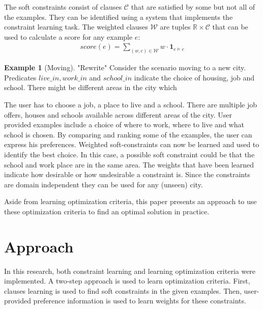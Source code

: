 \documentclass[letterpaper]{article}
\newcommand{\sym}[1]{\ensuremath{\mathcal{#1}}}
\theoremstyle{definition}
\newtheorem{example}{Example}
\begin{document}
The soft constraints consist of clauses \sym{C} that are satisfied by some but not all of the examples.
They can be identified using a system that implements the constraint learning task.
The weighted clauses \sym{W} are tuples $\mathbb{R} \times \sym{C}$ that can be used to calculate a score for any example $e$:
\begin{eqnarray*}
  score(e) = \sum\limits_{(\mathit{w}, \mathit{c}) \in \sym{W}} \mathit{w} \cdot \mathbf{1}_{e \models c}
\end{eqnarray*}

\begin{example}[Moving] "Rewrite"
  \label{ex:moving}
  Consider the scenario moving to a new city.
  Predicates $\mathit{live\_in}, \mathit{work\_in}$ and $\mathit{school\_in}$ indicate the choice of housing, job and school.
  There might be different areas in the city which 

  The user has to choose a job, a place to live and a school.
  There are multiple job offers, houses and schools available across different areas of the city.
  User provided examples include a choice of where to work, where to live and what school is chosen.
  By comparing and ranking some of the examples, the user can express his preferences.
  Weighted soft-constraints can now be learned and used to identify the best choice.
  In this case, a possible soft constraint could be that the school and work place are in the same area.
  The weights that have been learned indicate how desirable or how undesirable a constraint is.
  Since the constraints are domain independent they can be used for any (unseen) city.
\end{example}

Aside from learning optimization criteria, this paper presents an approach to use these optimization criteria to find an optimal solution in practice.


\section{Approach}
In this research, both constraint learning and learning optimization criteria were implemented.
A two-step approach is used to learn optimization criteria.
First, clauses learning is used to find soft constraints in the given examples.
Then, user-provided preference information is used to learn weights for these constraints.
\end{document}
